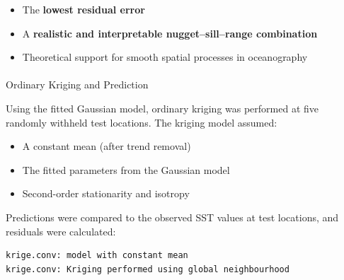 \documentclass[
  11pt,
]{article}
\makeatletter
\let\oldparagraph\paragraph
\renewcommand{\paragraph}{
    \@ifstar
      \xxxParagraphStar
      \xxxParagraphNoStar
  }
\newcommand{\xxxParagraphStar}[1]{\oldparagraph*{#1}\mbox{}}
\newcommand{\xxxParagraphNoStar}[1]{\oldparagraph{#1}\mbox{}}
\newenvironment{Shaded}{\begin{snugshade}}{\end{snugshade}}
\newcommand{\AttributeTok}[1]{\textcolor[rgb]{0.40,0.45,0.13}{#1}}
\newcommand{\CommentTok}[1]{\textcolor[rgb]{0.37,0.37,0.37}{#1}}
\newcommand{\FunctionTok}[1]{\textcolor[rgb]{0.28,0.35,0.67}{#1}}
\newcommand{\NormalTok}[1]{\textcolor[rgb]{0.00,0.23,0.31}{#1}}
\newcommand{\OtherTok}[1]{\textcolor[rgb]{0.00,0.23,0.31}{#1}}
\newcommand{\SpecialCharTok}[1]{\textcolor[rgb]{0.37,0.37,0.37}{#1}}
\newcommand{\StringTok}[1]{\textcolor[rgb]{0.13,0.47,0.30}{#1}}
\makeatother
\begin{document}
\begin{itemize}
\item
  The \textbf{lowest residual error}
\item
  A \textbf{realistic and interpretable nugget--sill--range combination}
\item
  Theoretical support for smooth spatial processes in oceanography
\end{itemize}

\paragraph{Ordinary Kriging and
Prediction}\label{ordinary-kriging-and-prediction}

Using the fitted Gaussian model, ordinary kriging was performed at five
randomly withheld test locations. The kriging model assumed:

\begin{itemize}
\item
  A constant mean (after trend removal)
\item
  The fitted parameters from the Gaussian model
\item
  Second-order stationarity and isotropy
\end{itemize}

Predictions were compared to the observed SST values at test locations,
and residuals were calculated:

\begin{Shaded}
\end{Shaded}

\begin{verbatim}
krige.conv: model with constant mean
krige.conv: Kriging performed using global neighbourhood 
\end{verbatim}
\end{document}
